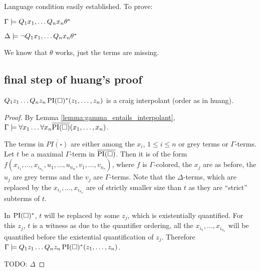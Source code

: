 	Language condition easily established. To prove:

	$\Gamma \models Q_1 x_1, \ldots Q_n x_n \theta^*$

	$\Delta \models \lnot Q_1 x_1, \ldots Q_n x_n \theta^*$

	We know that $\theta$ works, just the terms are missing.

\subsection{final step of huang's proof}

\begin{thm}
	$Q_1 z_1 \ldots Q_n z_n \operatorname{PI}(\square)^*(z_1, \ldots, z_n)$ is a craig interpolant (order as in huang).
\end{thm}
\begin{proof}
	By Lemma \ref{lemma:gamma_entails_interpolant}, $\Gamma \models \forall x_1 \ldots \forall x_n \overline{\operatorname{PI}(\square)}(x_1, \ldots, x_n)$.

	The terms in $\overline{PI(\square)}$ are either among the $x_i$, $1 \leq i \leq n$ or grey terms or $\Gamma$-terms.
	Let $t$ be a maximal $\Gamma$-term in $\overline{\operatorname{PI}(\square)}$.
	Then it is of the form $f(x_{i_1}, \ldots, x_{i_{n_x}}, u_1, \ldots, u_{n_u}, v_1, \ldots, v_{n_v})$, where $f$ is $\Gamma$-colored, the $x_j$ are as before, the $u_j$ are grey terms and the $v_j$ are $\Gamma$-terms.
	Note that the $\Delta$-terms, which are replaced by the $x_{i_1}, \ldots, x_{i_{n_x}}$ are of strictly smaller size than $t$ as they are ``strict'' subterms of $t$.

	In $\operatorname{PI}(\square)^*$, $t$ will be replaced by some $z_j$, which is existentially quantified.
	For this $z_j$, $t$ is a witness as due to the quantifier ordering, all the $x_{i_1}, \ldots, x_{i_{n_x}}$ will be quantified before the existential quantification of $z_j$.
	Therefore $\Gamma \models Q_1 z_1 \ldots Q_n z_n \operatorname{PI}(\square)^*(z_1, \ldots, z_n)$.

	TODO: $\Delta$
\end{proof}



